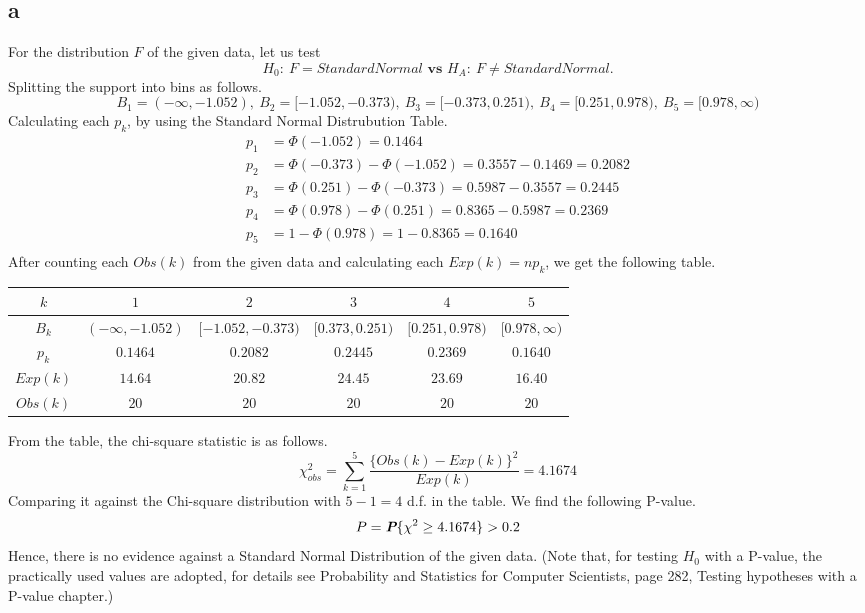 \documentclass[11pt]{article}
\begin{document}
\subsection*{a}
For the distribution $F$ of the given data, let us test
\begin{equation*}
	H_0: \ F = StandardNormal \textbf{ vs } H_A: \ F \neq StandardNormal.
\end{equation*}
Splitting the support into bins as follows.
\begin{equation}
	B_1 = (-\infty, -1.052), \ B_2 = [-1.052, -0.373), \ B_3 = [-0.373, 0.251), \ B_4 = [0.251, 0.978), \ B_5 = [0.978, \infty)
\end{equation}
Calculating each $p_k$, by using the Standard Normal Distrubution Table.
\begin{equation}
\begin{split}
	p_1 & = \Phi(-1.052) = 0.1464 \\
	p_2 & = \Phi(-0.373) - \Phi(-1.052) = 0.3557 - 0.1469 = 0.2082 \\
	p_3 & = \Phi(0.251) - \Phi(-0.373) = 0.5987 - 0.3557 = 0.2445 \\
	p_4 & = \Phi(0.978) - \Phi(0.251) = 0.8365 - 0.5987 = 0.2369 \\
	p_5 & = 1 - \Phi(0.978) = 1 - 0.8365 = 0.1640 \\
	\end{split}
\end{equation}
After counting each $Obs(k)$ from the given data and calculating each $Exp(k) = np_k$, we get the following table.

\begin{table}[H]
\begin{center}
\begin{tabular}{ | c | c | c | c | c | c |} 
\hline
$k$ & $1$ & $2$ & $3$ & $4$ & $5$ \\
\hline
$B_k$ & $(-\infty, -1.052)$ & $[-1.052, -0.373)$ & $[0.373, 0.251)$ & $[0.251, 0.978)$ & $[0.978, \infty)$ \\
\hline
$p_k$ & $0.1464$ & $0.2082$ & $0.2445$ & $0.2369$ & $0.1640$ \\
\hline
$Exp(k)$ & $14.64$ & $20.82$ & $24.45$ & $23.69$ & $16.40$ \\
\hline
$Obs(k)$ & $20$ & $20$ & $20$ & $20$ & $20$ \\
\hline
\end{tabular}
\end{center}
\end{table}
From the table, the chi-square statistic is as follows.
\begin{equation}
	\chi^2_{obs} = \sum\limits_{k = 1}^{5}\frac{\{Obs(k) - Exp(k)\}^2}{Exp(k)} = 4.1674
\end{equation}
Comparing it against the Chi-square distribution with $5 - 1 = 4$ d.f. in the table. We find the following P-value.
\begin{equation}
	P = \textit{\textbf{P}}\{\chi^2 \geq 4.1674\} > 0.2
\end{equation}
Hence, there is no evidence against a Standard Normal Distribution of the given data. (Note that, for testing $H_0$ with a P-value, the practically used values are adopted, for details see Probability and Statistics for Computer Scientists, page 282, Testing hypotheses with a P-value chapter.)
\end{document}
